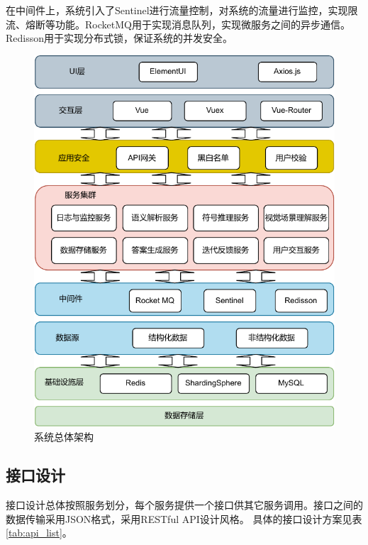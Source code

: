 在中间件上，系统引入了Sentinel进行流量控制，对系统的流量进行监控，实现限流、熔断等功能。RocketMQ用于实现消息队列，实现微服务之间的异步通信。
Redisson用于实现分布式锁，保证系统的并发安全。
\begin{figure}[htbp]
    \centering
    \includegraphics{figures/system_architecture-crop.pdf}
    \caption{系统总体架构}
    \label{fig:overall_architecture}
\end{figure}
\subsection{接口设计}
接口设计总体按照服务划分，每个服务提供一个接口供其它服务调用。接口之间的数据传输采用JSON格式，采用RESTful API设计风格。
具体的接口设计方案见表\ref{tab:api_list}。
\begin{table}
    \centering
    \label{tab:api_list}
    \caption{主要接口列表}
\end{table}

